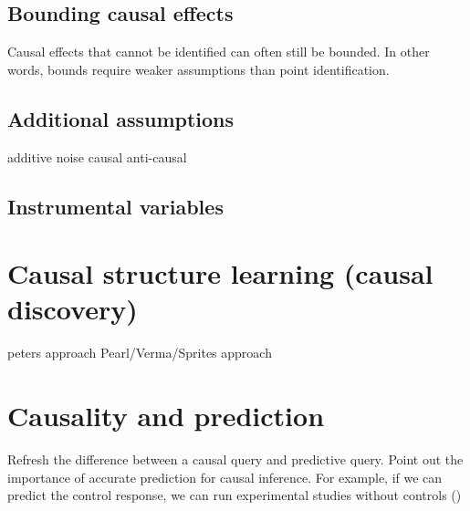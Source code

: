 \documentclass[11pt,a4paper]{article}
\begin{document}
\subsection{Bounding causal effects}
Causal effects that cannot be identified can often still be bounded. In other words, bounds require weaker assumptions than point identification.
 
\subsection{Additional assumptions}
additive noise
causal anti-causal \cite{Janzing2012}

\subsection{Instrumental variables}



\section{Causal structure learning (causal discovery)}
\label{sec:causaldiscovery}
peters approach \cite{Peters2014}
Pearl/Verma/Sprites approach \cite{Pearl2000} 

\section{Causality and prediction}
Refresh the difference between a causal query and predictive query.
Point out the importance of accurate prediction for causal inference. For example, if we can predict the control response, we can run experimental studies without controls (\cite{Brodersen2013})


\end{document}

